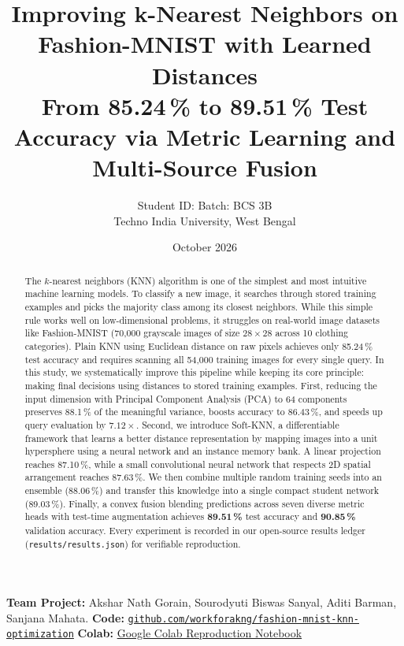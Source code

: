 \documentclass[10pt,a4paper]{article}
\title{\vspace{-0.6cm}\textbf{\Large Improving k-Nearest Neighbors on Fashion-MNIST with Learned Distances}\\[0.3em]
\large From 85.24\,\% to 89.51\,\% Test Accuracy via Metric Learning and Multi-Source Fusion\vspace{-0.2cm}}
\author{\textbf{\StudentName} \quad \small Student ID: \StudentID \quad Batch: BCS 3B\\
\small Techno India University, West Bengal%
\ifdefempty{\StudentEmail}{}{\\ \small\texttt{\StudentEmail}}}
\date{\vspace{-0.25cm}\small October 2026\vspace{-0.3cm}}
\newcommand{\file}[1]{\nolinkurl{#1}}
\begin{document}
\maketitle

\vspace{-0.25cm}
\begin{center}
\footnotesize \textbf{Team Project:} Akshar Nath Gorain, Sourodyuti Biswas Sanyal, Aditi Barman, Sanjana Mahata. \quad
\textbf{Code:} \href{https://github.com/workforakng/fashion-mnist-knn-optimization}{\nolinkurl{github.com/workforakng/fashion-mnist-knn-optimization}} \quad
\textbf{Colab:} \href{https://colab.research.google.com/github/workforakng/fashion-mnist-knn-optimization/blob/main/fashion_knn_colab.ipynb}{Google Colab Reproduction Notebook}
\end{center}
\vspace{-0.15cm}

\begin{abstract}
\noindent
The $k$-nearest neighbors (KNN) algorithm is one of the simplest and most intuitive machine learning models. To classify a new image, it searches through stored training examples and picks the majority class among its closest neighbors. While this simple rule works well on low-dimensional problems, it struggles on real-world image datasets like Fashion-MNIST (70{,}000 grayscale images of size $28\times28$ across 10 clothing categories). Plain KNN using Euclidean distance on raw pixels achieves only 85.24\,\% test accuracy and requires scanning all 54{,}000 training images for every single query. In this study, we systematically improve this pipeline while keeping its core principle: making final decisions using distances to stored training examples. First, reducing the input dimension with Principal Component Analysis (PCA) to 64 components preserves 88.1\,\% of the meaningful variance, boosts accuracy to 86.43\,\%, and speeds up query evaluation by $7.12\times$. Second, we introduce Soft-KNN, a differentiable framework that learns a better distance representation by mapping images into a unit hypersphere using a neural network and an instance memory bank. A linear projection reaches 87.10\,\%, while a small convolutional neural network that respects 2D spatial arrangement reaches 87.63\,\%. We then combine multiple random training seeds into an ensemble (88.06\,\%) and transfer this knowledge into a single compact student network (89.03\,\%). Finally, a convex fusion blending predictions across seven diverse metric heads with test-time augmentation achieves \textbf{89.51\,\%} test accuracy and \textbf{90.85\,\%} validation accuracy. Every experiment is recorded in our open-source results ledger (\file{results/results.json}) for verifiable reproduction.
\end{abstract}
\end{document}
